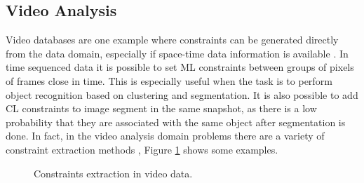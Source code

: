 \subsection{Video Analysis}

Video databases are one example where constraints can be generated directly from the data domain, especially if space-time data information is available \cite{yan2006discriminative}. In time sequenced data it is possible to set \acf{ML} constraints between groups of pixels of frames close in time. This is especially useful when the task is to perform object recognition based on clustering and segmentation. It is also possible to add \acf{CL} constraints to image segment in the same snapshot, as there is a low probability that they are associated with the same object after segmentation is done. In fact, in the video analysis domain problems there are a variety of constraint extraction methods \cite{yan2006discriminative}, Figure \ref{fig:ConstExtractionVideo} shows some examples. 

\begin{figure}[bth]
	\myfloatalign
	\quad
	 \quad
	\quad
	\caption[Constraints extraction in video data.]{Constraints extraction in video data. \cite{yan2006discriminative} \cite{davidson2007survey}}\label{fig:ConstExtractionVideo}
\end{figure}

